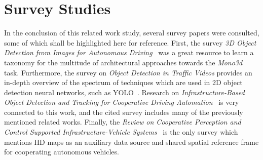 \section{Survey Studies}
\label{sec:related-surveys}

In the conclusion of this related work study, several survey papers were consulted, some of which shall be highlighted here for reference.
First, the survey \textit{3D Object Detection from Images for Autonomous Driving}~\cite{survey2022} was a great resource to learn a taxonomy for the multitude of architectural approaches towards the \textit{Mono3d} task.
Furthermore, the survey on \textit{Object Detection in Traffic Videos} provides an in-depth overview of the spectrum of techniques which are used in 2D object detection neural networks, such as YOLO~\cite{wang2022yolov7}.
Research on \textit{Infrastructure-Based Object Detection and Tracking for Cooperative Driving Automation}~\cite{bai2022infrastructure} is very connected to this work, and the cited survey includes many of the previously mentioned related works.
Finally, the \textit{Review on Cooperative Perception and Control Supported Infrastructure-Vehicle Systems}~\cite{yu2022review} is the only survey which mentions HD maps as an auxiliary data source and shared spatial reference frame for cooperating autonomous vehicles.

